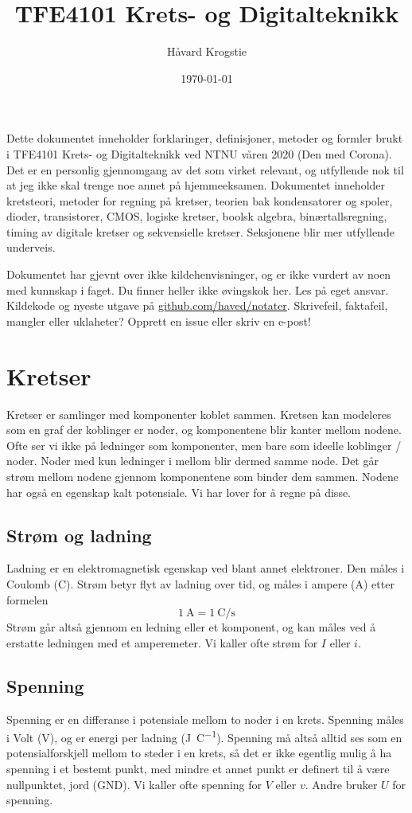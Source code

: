 \documentclass[12pt,a4paper,norsk]{article}
\title{TFE4101 Krets- og Digitalteknikk}
\author{Håvard Krogstie\\\randomize{\lst{}.\fst{}@gmail.com}}
\date{\today}
\begin{document}
\maketitle

\noindent
Dette dokumentet inneholder forklaringer, definisjoner, metoder og formler brukt
i TFE4101 Krets- og Digitalteknikk ved NTNU våren 2020 (Den med Corona). Det er
en personlig gjennomgang av det som virket relevant, og utfyllende nok til at jeg
ikke skal trenge noe annet på hjemmeeksamen. Dokumentet inneholder kretsteori,
metoder for regning på kretser, teorien bak kondensatorer og spoler, dioder,
transistorer, CMOS, logiske kretser, boolsk algebra, binærtallsregning, timing
av digitale kretser og sekvensielle kretser. Seksjonene blir mer utfyllende
underveis.

Dokumentet har gjevnt over ikke kildehenvisninger, og er ikke vurdert av noen
med kunnskap i faget. Du finner heller ikke øvingskok her. Les på eget ansvar.
Kildekode og nyeste utgave på
\href{https://github.com/haved/notater/}{github.com/haved/notater}. Skrivefeil,
faktafeil, mangler eller uklaheter? Opprett en issue eller skriv en e-post!

\clearpage
\tableofcontents
\clearpage

\section{Kretser}
Kretser er samlinger med komponenter koblet sammen. Kretsen kan modeleres som en
graf der koblinger er noder, og komponentene blir kanter mellom
nodene. Ofte ser vi ikke på ledninger som komponenter, men bare som
ideelle koblinger / noder. Noder med kun ledninger i mellom blir dermed samme
node. Det går strøm mellom nodene gjennom komponentene som binder dem sammen.
Nodene har også en egenskap kalt potensiale. Vi har lover for å regne på disse.

\subsection{Strøm og ladning}
Ladning er en elektromagnetisk egenskap ved blant annet elektroner. Den måles i
Coulomb (\si{\coulomb}). Strøm betyr flyt av ladning over tid, og måles i ampere
(\si{\ampere}) etter formelen
\[\SI{1}{\ampere} = \SI{1}{\coulomb\per\second}\]
Strøm går altså gjennom en ledning eller et komponent, og kan måles ved å
erstatte ledningen med et amperemeter. Vi kaller ofte strøm for $I$ eller $i$.

\subsection{Spenning}
Spenning er en differanse i potensiale mellom to noder i en krets. Spenning
måles i Volt (\si{\volt}), og er energi per ladning (\si{\joule\per\coulomb}).
Spenning må altså alltid ses som en potensialforskjell mellom to steder i en
krets, så det er ikke egentlig mulig å ha spenning i et bestemt punkt, med
mindre et annet punkt er definert til å være nullpunktet, jord (GND). Vi kaller
ofte spenning for $V$ eller $v$. Andre bruker $U$ for spenning.
\end{document}
